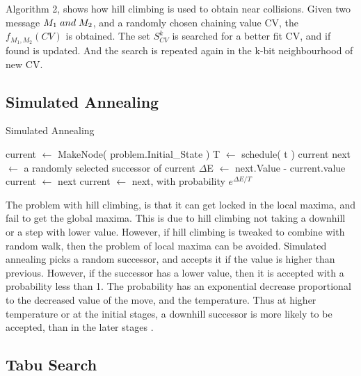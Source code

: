 \documentclass[12pt]{artikel3}                  %
\begin{document}
Algorithm 2, shows how hill climbing is used to obtain near collisions. Given two message $M_{1} \thickspace and \thickspace M_{2}$, 
and a randomly chosen chaining value CV, the $f_{M_{1}, M_{2}}(CV)$ is obtained. The set $S^{k}_{CV}$ is searched
for a better fit CV, and if found is updated. And the search is repeated again in the k-bit neighbourhood of new CV.

\subsection{Simulated Annealing}

\begin{algorithm}
  \caption{ Simulated Annealing }
  \begin{algorithmic}[1]
      \State current $\gets$ MakeNode( problem.Initial\_State )
        \State T $\gets$ schedule( t )
          \State \Return current
        \EndIf
        \State next $\gets$ a randomly selected successor of current
        \State $\Delta$E $\gets$ next.Value - current.value
          \State current $\gets$ next
        \Else
          \State current $\gets$ next, with probability $e^{\Delta E / T}$
        \EndIf
      \EndFor
    \EndFunction
  \end{algorithmic}
\end{algorithm}

The problem with hill climbing, is that it can get locked in the local maxima, and fail to get the global maxima.
This is due to hill climbing not taking a downhill or a step with lower value. However, if hill climbing is 
tweaked to combine with random walk, then the problem of local maxima can be avoided. Simulated annealing picks
a random successor, and accepts it if the value is higher than previous. However, if the successor has a lower
value, then it is accepted with a probability less than 1. The probability has an exponential decrease proportional
to the decreased value of the move, and the temperature. Thus at higher temperature or at the initial stages, a
downhill successor is more likely to be accepted, than in the later stages \cite{00033}.

\subsection{Tabu Search}
\end{document}
